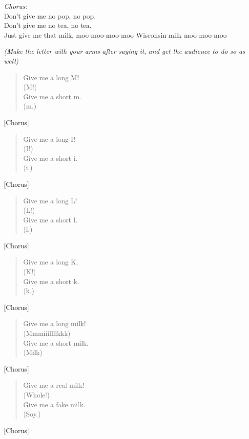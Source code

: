 
\begin{center}
\textit{Chorus:} \\
Don't give me no pop, no pop. \\
Don't give me no tea, no tea. \\
Just give me that milk, moo-moo-moo-moo Wisconsin milk moo-moo-moo \\
\end{center}

\textit{(Make the letter with your arms after saying it, and get the audience to do so as well)}

\begin{verse}
Give me a long M! \\
(M!) \\
Give me a short m. \\
(m.) \\
\end{verse}

[Chorus]

\begin{verse}
Give me a long I! \\
(I!) \\
Give me a short i. \\
(i.) \\
\end{verse}

[Chorus]

\begin{verse}
Give me a long L! \\
(L!) \\
Give me a short l. \\
(l.) \\
\end{verse}

[Chorus]

\begin{verse}
Give me a long K. \\
(K!) \\
Give me a short k. \\
(k.) \\
\end{verse}

[Chorus]

\begin{verse}
Give me a long milk! \\
(Mmmiiillllkkk) \\
Give me a short milk. \\
(Milk) \\
\end{verse}

[Chorus]

\begin{verse}
Give me a real milk! \\
(Whole!) \\
Give me a fake milk. \\
(Soy.) \\
\end{verse}

[Chorus]

